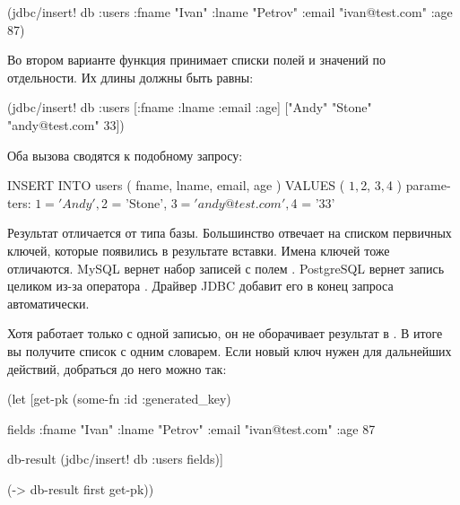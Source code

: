 \begin{english}
  \begin{clojure}
(jdbc/insert! db :users {:fname "Ivan"
                         :lname "Petrov"
                         :email "ivan@test.com"
                         :age 87})
  \end{clojure}
\end{english}

Во втором варианте функция принимает списки полей и значений по отдельности. Их длины должны быть равны:

\begin{english}
  \begin{clojure}
(jdbc/insert! db :users
              [:fname :lname :email :age]
              ["Andy" "Stone" "andy@test.com" 33])
  \end{clojure}
\end{english}

Оба вызова сводятся к подобному запросу:

\begin{english}
  \begin{sql}
INSERT INTO users ( fname, lname, email, age ) VALUES ( $1, $2, $3, $4 )
parameters: $1 = 'Andy', $2 = 'Stone', $3 = 'andy@test.com', $4 = '33'
  \end{sql}
\end{english}

Результат  отличается от типа базы. Большинство отвечает на  списком первичных ключей, которые появились в результате вставки. Имена ключей тоже отличаются. MySQL вернет набор записей с полем . PostgreSQL вернет запись целиком из-за оператора . Драйвер JDBC добавит его в конец запроса автоматически.

Хотя  работает только с одной записью, он не оборачивает результат в . В итоге вы получите список с одним словарем. Если новый ключ нужен для дальнейших действий, добраться до него можно так:

\begin{english}
  \begin{clojure}
(let [get-pk
      (some-fn :id :generated_key)

      fields
      {:fname "Ivan"
       :lname "Petrov"
       :email "ivan@test.com"
       :age 87}

      db-result
      (jdbc/insert! db :users fields)]

  (-> db-result first get-pk))
  \end{clojure}
\end{english}

